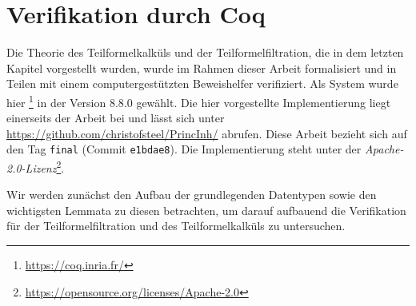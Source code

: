 \chapter{Verifikation durch Coq}
\label{ch:coq}
Die Theorie des Teilformelkalküls und der Teilformelfiltration, die in dem letzten Kapitel vorgestellt wurden, wurde im Rahmen dieser Arbeit formalisiert und in Teilen mit einem computergestützten Beweishelfer verifiziert. Als System wurde hier \coq{}\footnote{\url{https://coq.inria.fr/}} in der Version 8.8.0 gewählt. Die hier vorgestellte Implementierung liegt einerseits der Arbeit bei und lässt sich unter \url{https://github.com/christofsteel/PrincInh/} abrufen. Diese Arbeit bezieht sich auf den Tag \texttt{final} (Commit \texttt{e1bdae8}). Die Implementierung steht unter der \emph{Apache-2.0-Lizenz}\footnote{\url{https://opensource.org/licenses/Apache-2.0}}. 

Wir werden zunächst den Aufbau der grundlegenden Datentypen sowie den wichtigsten Lemmata zu diesen betrachten, um darauf aufbauend die Verifikation für  der Teilformelfiltration und  des Teilformelkalküls zu untersuchen.
